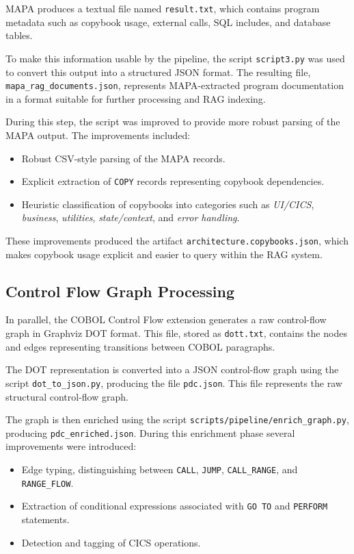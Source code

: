 \documentclass[11pt]{article}
\begin{document}
MAPA produces a textual file named \texttt{result.txt}, which contains program metadata such as copybook usage, external calls, SQL includes, and database tables. 

To make this information usable by the pipeline, the script \texttt{script3.py} was used to convert this output into a structured JSON format. The resulting file, \texttt{mapa\_rag\_documents.json}, represents MAPA-extracted program documentation in a format suitable for further processing and RAG indexing.

During this step, the script was improved to provide more robust parsing of the MAPA output. The improvements included:

\begin{itemize}
\item Robust CSV-style parsing of the MAPA records.
\item Explicit extraction of \texttt{COPY} records representing copybook dependencies.
\item Heuristic classification of copybooks into categories such as \textit{UI/CICS}, \textit{business}, \textit{utilities}, \textit{state/context}, and \textit{error handling}.
\end{itemize}

These improvements produced the artifact \texttt{architecture.copybooks.json}, which makes copybook usage explicit and easier to query within the RAG system.

\subsection*{Control Flow Graph Processing}

In parallel, the COBOL Control Flow extension generates a raw control-flow graph in Graphviz DOT format. This file, stored as \texttt{dott.txt}, contains the nodes and edges representing transitions between COBOL paragraphs.

The DOT representation is converted into a JSON control-flow graph using the script \texttt{dot\_to\_json.py}, producing the file \texttt{pdc.json}. This file represents the raw structural control-flow graph.

The graph is then enriched using the script \texttt{scripts/pipeline/enrich\_graph.py}, producing \texttt{pdc\_enriched.json}. During this enrichment phase several improvements were introduced:

\begin{itemize}
\item Edge typing, distinguishing between \texttt{CALL}, \texttt{JUMP}, \texttt{CALL\_RANGE}, and \texttt{RANGE\_FLOW}.
\item Extraction of conditional expressions associated with \texttt{GO TO} and \texttt{PERFORM} statements.
\item Detection and tagging of CICS operations.
\end{itemize}
\end{document}
